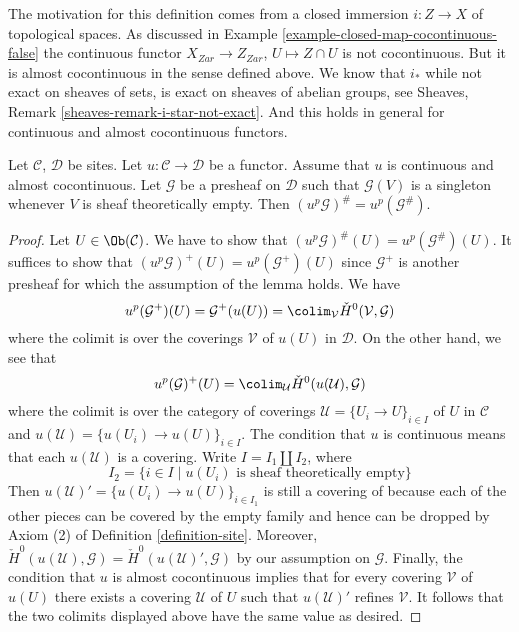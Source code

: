 \noindent
The motivation for this definition comes from a closed immersion
$i : Z \to X$ of topological spaces. As discussed in
Example \ref{example-closed-map-cocontinuous-false}
the continuous functor
$X_{Zar} \to Z_{Zar}$, $U \mapsto Z \cap U$ is
not cocontinuous. But it is almost cocontinuous in the sense defined above.
We know that $i_*$ while not exact on sheaves of sets, is
exact on sheaves of abelian groups, see
Sheaves, Remark \ref{sheaves-remark-i-star-not-exact}.
And this holds in general for continuous and almost cocontinuous functors.

\begin{lemma}
\label{lemma-almost-cocontinuous-sheafification}
Let $\mathcal{C}$, $\mathcal{D}$ be sites.
Let $u : \mathcal{C} \to \mathcal{D}$ be a functor.
Assume that $u$ is continuous and almost cocontinuous.
Let $\mathcal{G}$ be a presheaf on $\mathcal{D}$ such that $\mathcal{G}(V)$ is
a singleton whenever $V$ is sheaf theoretically empty.
Then $(u^p\mathcal{G})^\# = u^p(\mathcal{G}^\#)$.
\end{lemma}

\begin{proof}
Let $U \in \Ob(\mathcal{C})$. We have to show that
$(u^p\mathcal{G})^\#(U) = u^p(\mathcal{G}^\#)(U)$.
It suffices to show that
$(u^p\mathcal{G})^+(U) = u^p(\mathcal{G}^+)(U)$
since $\mathcal{G}^+$ is another presheaf for which the
assumption of the lemma holds. We have
$$
u^p(\mathcal{G}^+)(U) =
\mathcal{G}^+(u(U)) =
\colim_\mathcal{V} \check H^0(\mathcal{V}, \mathcal{G})
$$
where the colimit is over the coverings $\mathcal{V}$ of $u(U)$ in
$\mathcal{D}$. On the other hand, we see that
$$
u^p(\mathcal{G})^+(U) =
\colim_\mathcal{U} \check H^0(u(\mathcal{U}), \mathcal{G})
$$
where the colimit is over the category of coverings
$\mathcal{U} = \{U_i \to U\}_{i \in I}$ of $U$ in $\mathcal{C}$ and
$u(\mathcal{U}) = \{u(U_i) \to u(U)\}_{i \in I}$. The condition
that $u$ is continuous means that each $u(\mathcal{U})$ is a covering.
Write $I = I_1 \amalg I_2$, where
$$
I_2 = \{i \in I \mid u(U_i)\text{ is sheaf theoretically empty}\}
$$
Then $u(\mathcal{U})' = \{u(U_i) \to u(U)\}_{i \in I_1}$ is still a covering of
because each of the other pieces can be covered by the empty family
and hence can be dropped by Axiom (2) of
Definition \ref{definition-site}.
Moreover,
$\check H^0(u(\mathcal{U}), \mathcal{G}) =
\check H^0(u(\mathcal{U})', \mathcal{G})$
by our assumption on $\mathcal{G}$. Finally, the condition that $u$ is
almost cocontinuous implies that for every covering $\mathcal{V}$
of $u(U)$ there exists a covering $\mathcal{U}$ of $U$ such that
$u(\mathcal{U})'$ refines $\mathcal{V}$. It follows that the two colimits
displayed above have the same value as desired.
\end{proof}

